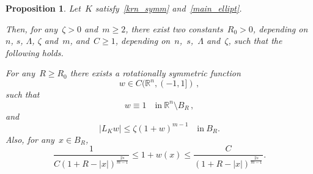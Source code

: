 \documentclass[10pt,a4paper]{amsart}
\newtheorem{prop}[theorem]{Proposition}
\numberwithin{equation}{section}
\newcommand{\R}{\mathbb{R}}
\begin{document}
      \begin{prop}\label{prop_bar}
     Let~${K}$ satisfy~\eqref{krn_symm} and~\eqref{main_ellipt}.
     
     Then, for any~$\zeta>0$ and~$m \geq2$, there exist two constants~$R_0>0$, depending on~$n$, $s$, $\Lambda$, $\zeta$ and~$m$, and~$C\geq 1$, depending on~$n$,~$s$,~$\Lambda$ and~$\zeta$, such that the following holds.
     
     For any~$R\geq R_0$ there exists a rotationally symmetric function
     \begin{equation}\label{barrier}
w \in C(\R^n,(-1,1])\,,
\end{equation}
such that
\begin{equation}\label{bar_outside_interval}
w \equiv 1 \quad\mbox{in} \  \R^n \setminus B_R\,,
\end{equation}
and
\begin{equation}\label{bar_sol}
|{L}_K w | \leq \zeta (1+w)^{m-1}\quad\mbox{in} \ B_R.
\end{equation}
Also, for any~$x \in B_R$,
\begin{equation}\label{bar_decay}
\frac{1}{C(1+R-|x |)^{\frac{2s}{m-1}}} \leq 1+w(x) \leq \frac{C}{(1+R-|x |)^{\frac{2s}{m-1}}}.
\end{equation}
\end{prop}
\end{document}
